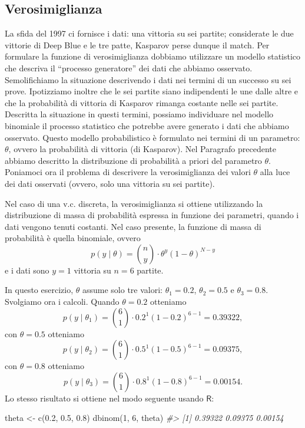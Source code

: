 \documentclass[
  10pt,
  italian,
  a4paper,
  extrafontsizes,onecolumn,openright
  ]{memoir}
\newenvironment{Shaded}{\begin{snugshade}}{\end{snugshade}}
\newcommand{\CommentTok}[1]{\textcolor[rgb]{0.56,0.35,0.01}{\textit{#1}}}
\newcommand{\DecValTok}[1]{\textcolor[rgb]{0.00,0.00,0.81}{#1}}
\newcommand{\FloatTok}[1]{\textcolor[rgb]{0.00,0.00,0.81}{#1}}
\newcommand{\FunctionTok}[1]{\textcolor[rgb]{0.00,0.00,0.00}{#1}}
\newcommand{\NormalTok}[1]{#1}
\newcommand{\OtherTok}[1]{\textcolor[rgb]{0.56,0.35,0.01}{#1}}
\begin{document}
\hypertarget{verosimiglianza}{%
\subsection{Verosimiglianza}\label{verosimiglianza}}

La sfida del 1997 ci fornisce i dati: una vittoria su sei partite; considerate le due vittorie di Deep Blue e le tre patte, Kasparov perse dunque il match. Per formulare la funzione di verosimiglianza dobbiamo utilizzare un modello statistico che descriva il ``processo generatore'' dei dati che abbiamo osservato. Semolifichiamo la situazione descrivendo i dati nei termini di un successo su sei prove. Ipotizziamo inoltre che le sei partite siano indipendenti le une dalle altre e che la probabilità di vittoria di Kasparov rimanga costante nelle sei partite. Descritta la situazione in questi termini, possiamo individuare nel modello binomiale il processo statistico che potrebbe avere generato i dati che abbiamo osservato. Questo modello probabilistico è formulato nei termini di un parametro: \(\theta\), ovvero la probabilità di vittoria (di Kasparov). Nel Paragrafo precedente abbiamo descritto la distribuzione di probabilità a priori del parametro \(\theta\). Poniamoci ora il problema di descrivere la verosimiglianza dei valori \(\theta\) alla luce dei dati osservati (ovvero, solo una vittoria su sei partite).

Nel caso di una v.c. discreta, la verosimiglianza si ottiene utilizzando la distribuzione di massa di probabilità espressa in funzione dei parametri, quando i dati vengono tenuti costanti. Nel caso presente, la funzione di massa di probabilità è quella binomiale, ovvero
\[
p(y \mid \theta) = \binom{n}{y} \cdot \theta^y (1-\theta)^{N-y}
\]
e i dati sono \(y = 1\) vittoria su \(n = 6\) partite.

In questo esercizio, \(\theta\) assume solo tre valori: \(\theta_1 = 0.2\), \(\theta_2 = 0.5\) e \(\theta_3 = 0.8\). Svolgiamo ora i calcoli. Quando \(\theta = 0.2\) otteniamo
\[
 p(y \mid \theta_1) = \binom{6}{1} \cdot 0.2^1 (1-0.2)^{6-1} = 0.39322,
\]
con \(\theta = 0.5\) otteniamo
\[
 p(y \mid \theta_2) = \binom{6}{1} \cdot 0.5^1 (1-0.5)^{6-1} = 0.09375,
\]
con \(\theta = 0.8\) otteniamo
\[
 p(y \mid \theta_3) = \binom{6}{1} \cdot 0.8^1 (1-0.8)^{6-1} = 0.00154.
\]
Lo stesso risultato si ottiene nel modo seguente usando \(\textsf{R}\):

\begin{Shaded}
\begin{Highlighting}[]
\NormalTok{theta }\OtherTok{\textless{}{-}} \FunctionTok{c}\NormalTok{(}\FloatTok{0.2}\NormalTok{, }\FloatTok{0.5}\NormalTok{, }\FloatTok{0.8}\NormalTok{)}
\FunctionTok{dbinom}\NormalTok{(}\DecValTok{1}\NormalTok{, }\DecValTok{6}\NormalTok{, theta)}
\CommentTok{\#\textgreater{} [1] 0.39322 0.09375 0.00154}
\end{Highlighting}
\end{Shaded}
\end{document}
